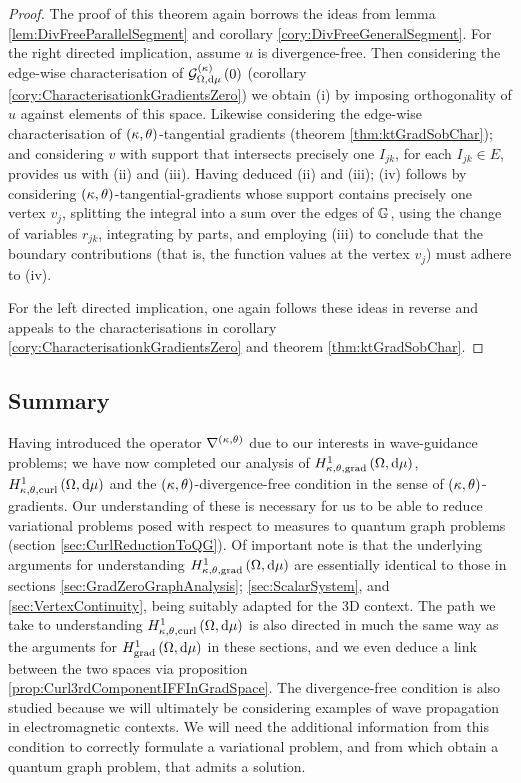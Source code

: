 \begin{proof}
	The proof of this theorem again borrows the ideas from lemma \ref{lem:DivFreeParallelSegment} and corollary \ref{cory:DivFreeGeneralSegment}.
	For the right directed implication, assume $u$ is divergence-free.
	Then considering the edge-wise characterisation of $\mathcal{G}_{ \Omega, \mathrm{d}\mu}^{(\kappa)}\left( 0 \right)$ (corollary \ref{cory:CharacterisationkGradientsZero}) we obtain (i) by imposing orthogonality of $u$ against elements of this space.
	Likewise considering the edge-wise characterisation of $\left( \kappa, \theta \right)$-tangential gradients (theorem \ref{thm:ktGradSobChar}); and considering $v$ with support that intersects precisely one $I_{jk}$, for each $I_{jk}\in E$, provides us with (ii) and (iii).
	Having deduced (ii) and (iii); (iv) follows by considering $\left( \kappa, \theta \right)$-tangential-gradients whose support contains precisely one vertex $v_j$, splitting the integral into a sum over the edges of $\mathbb{G}$, using the change of variables $r_{jk}$, integrating by parts, and employing (iii) to conclude that the boundary contributions (that is, the function values at the vertex $v_j$) must adhere to (iv). \newline
	
	For the left directed implication, one again follows these ideas in reverse and appeals to the characterisations in corollary \ref{cory:CharacterisationkGradientsZero} and theorem \ref{thm:ktGradSobChar}.
\end{proof}

\subsection{Summary}
Having introduced the operator $\nabla^{\left( \kappa, \theta \right)}$ due to our interests in wave-guidance problems; we have now completed our analysis of $H^1_{\kappa,\theta,\mathrm{grad}}\left( \Omega, \mathrm{d}\mu \right)$, $H^1_{\kappa,\theta,\mathrm{curl}}\left( \Omega, \mathrm{d}\mu \right)$ and the $\left( \kappa, \theta \right)$-divergence-free condition in the sense of $\left( \kappa, \theta \right)$-gradients.
Our understanding of these is necessary for us to be able to reduce variational problems posed with respect to measures to quantum graph problems (section \ref{sec:CurlReductionToQG}).
Of important note is that the underlying arguments for understanding $H^1_{\kappa,\theta,\mathrm{grad}}\left( \Omega, \mathrm{d}\mu \right)$ are essentially identical to those in sections \ref{sec:GradZeroGraphAnalysis}; \ref{sec:ScalarSystem}, and \ref{sec:VertexContinuity}, being suitably adapted for the 3D context.
The path we take to understanding $H^1_{\kappa,\theta,\mathrm{curl}}\left( \Omega, \mathrm{d}\mu \right)$ is also directed in much the same way as the arguments for $H^1_\mathrm{grad}\left( \Omega, \mathrm{d}\mu \right)$ in these sections, and we even deduce a link between the two spaces via proposition \ref{prop:Curl3rdComponentIFFInGradSpace}.
The divergence-free condition is also studied because we will ultimately be considering examples of wave propagation in electromagnetic contexts.
We will need the additional information from this condition to correctly formulate a variational problem, and from which obtain a quantum graph problem, that admits a solution.

